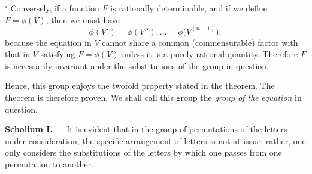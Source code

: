 \documentclass{article}
\begin{document}
\smallskip

\(^\circ\) Conversely, if a function \(F\) is rationally determinable, and if we define \(F = \phi(V)\), then we must have
\[
\phi(V') = \phi(V''), \dots = \phi\bigl(V^{(n-1)}\bigr),
\]
because the equation in \(V\) cannot share a common (commensurable) factor with that in \(V\) satisfying \(F = \phi(V)\) unless it is a purely rational quantity. Therefore \(F\) is necessarily invariant under the substitutions of the group in question.

\smallskip

\noindent
Hence, this group enjoys the twofold property stated in the theorem. The theorem is therefore proven. We shall call this group the \emph{group of the equation} in question.

\medskip

\noindent
\textbf{Scholium I.} --- It is evident that in the group of permutations of the letters under consideration, the specific arrangement of letters is not at issue; rather, one only considers the substitutions of the letters by which one passes from one permutation to another.
\end{document}
